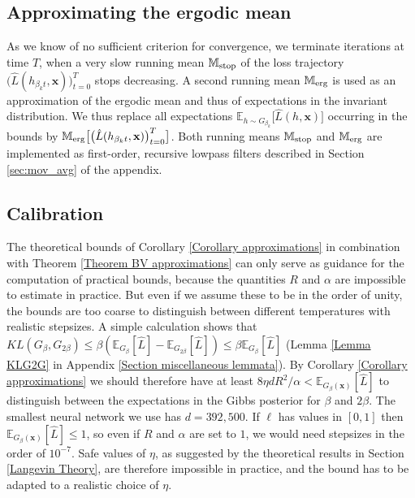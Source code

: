 \documentclass{article} %
\begin{document}
\subsection{Approximating the ergodic mean} \label{sec:ergodic_mean}
As we know of no sufficient criterion for convergence, we terminate
iterations at time $T$, when a very slow running mean $\mathbb{M}_{\rm stop}$ of
the loss trajectory $\big( \hat{L}( h_{\beta _{k}t},\mathbf{x})
\big) _{t=0}^{T}$ stops decreasing. A second running mean 
$\mathbb{M}_{\rm erg}$ is used as an approximation of the ergodic mean and thus of
expectations in the invariant distribution. We thus replace all expectations 
$\mathbb{E}_{h\sim G_{\beta _{k}}}\big[ \hat{L}( h,\mathbf{x})\big] $ occurring in the bounds by $\mathbb{M}_{\rm erg}\big[ \big( \hat{L}( h_{\beta _{k}t},\mathbf{x}) \big) _{t=0}^{T}\big] $. Both
running means $\mathbb{M}_{\rm stop}$ and $\mathbb{M}_{\rm erg}$ are implemented as
first-order, recursive lowpass filters described in Section \ref{sec:mov_avg} of the appendix.

\subsection{Calibration\label{Section calibration}} 
The theoretical bounds of Corollary \ref{Corollary approximations} in
combination with Theorem \ref{Theorem BV approximations} can only serve as guidance for the computation of practical bounds, because the quantities $R$ and $\alpha $ are impossible to
estimate in practice. But even if we assume these to be in the order of
unity, the bounds are too coarse to distinguish between different
temperatures with realistic stepsizes.\newline
A simple calculation shows that $KL\left( G_{\beta },G_{2\beta }\right) \leq
\beta \left( \mathbb{E}_{G_{\beta }}\left[ \hat{L}\right] -\mathbb{E}%
_{G_{2\beta }}\left[ \hat{L}\right] \right) \leq \beta \mathbb{E}_{G_{\beta
}}\left[ \hat{L}\right] $ (Lemma \ref{Lemma KLG2G} in Appendix \ref{Section
miscellaneous lemmata}). By Corollary \ref{Corollary approximations} we
should therefore have at least $8\eta dR^{2}/\alpha <\mathbb{E}_{G_{\beta
}\left( \mathbf{x}\right) }\left[ \hat{L}\right] $ to distinguish between
the expectations in the Gibbs posterior for $\beta $ and $2\beta $. The
smallest neural network we use has $d=392,500$. If $\ell $ has values in $%
\left[ 0,1\right] $ then $\mathbb{E}_{G_{\beta }\left( \mathbf{x}\right) }%
\left[ \hat{L}\right] \leq 1$, so even if $R$ and $\alpha $ are set to $1$,
we would need stepsizes in the order of $10^{-7}$. Safe values of $\eta $,
as suggested by the theoretical results in Section \ref{Langevin Theory},
are therefore impossible in practice, and the bound has to be adapted to a
realistic choice of $\eta $. 
\end{document}
